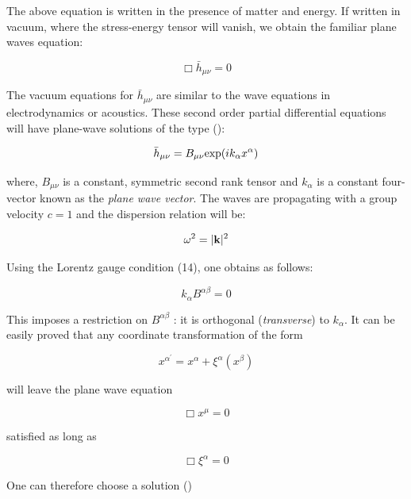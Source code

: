 \documentclass[epsf]{article}
\begin{document}
The above equation is written in the presence of matter and energy. If written in vacuum, 
where the stress-energy tensor will vanish, we obtain the familiar plane waves equation:

\begin{equation}
\Box \bar{h}_{\mu\nu} = 0
\end{equation}

The vacuum equations for $\bar{h}_{\mu\nu}$ are similar to the wave 
equations in electrodynamics or acoustics. 
These second order partial differential equations will have plane-wave solutions of the type (\cite{schutz,maggiore,chaky,ian}):

\begin{equation}
\bar{h}_{\mu\nu} = B_{\mu\nu} {\rm exp}(i k_{\alpha}x^{\alpha})
\end{equation}

where, $B_{\mu\nu}$ is a constant, symmetric second rank tensor and $k_{\alpha}$
is a constant four-vector known as the {\it plane wave vector}. The waves are propagating 
with a group velocity $c=1$ and the dispersion relation will be:

\begin{equation}
\omega^2 = |{\bf k}|^2
\end{equation}

Using the Lorentz gauge condition 
(14), one obtains as follows:

\begin{equation}
k_{\alpha} B^{\alpha\beta} = 0 
\end{equation}

This imposes a restriction on $B^{\alpha\beta}$ : it is orthogonal 
({\it transverse}) to $k_{\alpha}$. 
It can be easily proved that any coordinate transformation of the form

\begin{equation}
x^{\alpha^{\prime}} = x^{\alpha} + \xi^{\alpha}(x^{\beta})
\end{equation}

will leave the plane wave equation

\begin{equation}
\Box x^{\mu} = 0
\end{equation}

satisfied as long as

\begin{equation}
\Box \xi^{\alpha} = 0
\end{equation}

One can therefore choose a solution (\cite{chaky})
\end{document}
